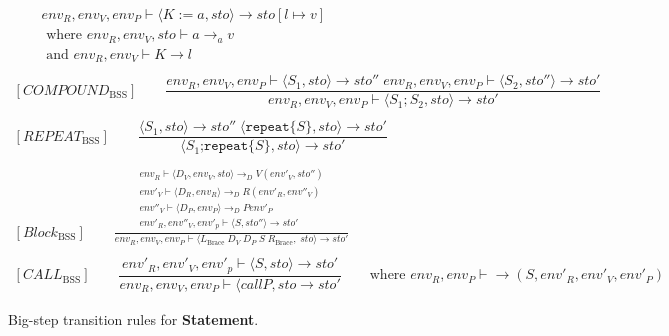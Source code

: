 \begin{figure}[htbp]
	\centering
	\begin{gather*}
		[ASSIGNMENT_\text{BSS}] 
		\qquad env_R, env_V, env_P \vdash \langle K:=a,sto\rangle \rightarrow sto[l\mapsto v] \\
		\qquad \text{ where } env_R, env_V, sto \vdash a \rightarrow_a v\\
		\qquad \text{ and } env_R, env_V \vdash K \rightarrow \textit{l}
		\\
		\\
		[COMPOUND_\text{BSS}] 
		\qquad \dfrac
		{env_R, env_V, env_P \vdash \langle S_1, sto \rangle \rightarrow sto'' \; env_R, env_V, env_P \vdash \langle S_2, sto'' \rangle \rightarrow sto'}
		{env_R, env_V, env_P \vdash \langle S_1;S_2,sto \rangle\rightarrow sto'}
		\\
		\\
		[REPEAT_\text{BSS}] 
		\qquad \dfrac
		{\langle S_1, sto \rangle \rightarrow sto'' \;\langle \texttt{repeat} \{S\}, sto \rangle \rightarrow sto'}
		{\langle S_1 \texttt{;repeat} \{S\}, sto \rangle\rightarrow sto'}
		\\
		\\
		[Block_\text{BSS}] 
		\qquad \frac
		{
			\begin{gathered}
				env_R \vdash \langle D_V, env_V, sto \rangle \rightarrow_DV (env'_V, sto'') \\
				env'_V \vdash \langle D_R, env_R \rangle \rightarrow_DR (env'_R, env''_V) \\
				env''_V \vdash \langle D_P, env_P \rangle \rightarrow_DP env'_P \\
				env'_R, env''_V, env'_p \vdash \langle S, sto'' \rangle \rightarrow sto'
			\end{gathered}
		}
		{env_R, env_V, env_P \vdash \langle L_\text{Brace} \; D_V \; D_P \; S \; R_\text{Brace}, \; sto\rangle\rightarrow sto'}
		\\
		\\
		[CALL_\text{BSS}]
		\qquad \dfrac{env'_R, env'_V, env'_p \vdash \langle S,sto \rangle \rightarrow sto'}{env_R, env_V, env_P \vdash \langle call P, sto \rightarrow sto'}
		\qquad \text{where } env_R, env_P \vdash \rightarrow (S, env'_R, env'_V, env'_P)
	\end{gather*}
	\caption{Big-step transition rules for \textbf{Statement}.}
	\label{fig:BssStm}
\end{figure}

